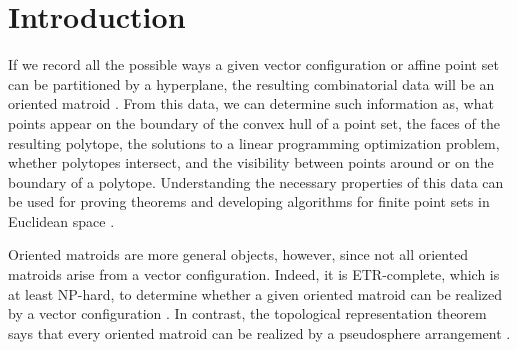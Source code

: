 \documentclass[11pt]{article}
\numberwithin{equation}{section}
\theoremstyle{remark}
\begin{document}
\section{Introduction}

If we record all the possible ways a given vector configuration or affine point set can be partitioned by a hyperplane, the resulting combinatorial data will be an oriented matroid \cite{bjorner1999oriented}.
From this data, we can determine such information as, what points appear on the boundary of the convex hull of a point set, the faces of the resulting polytope, the solutions to a linear programming optimization problem, whether polytopes intersect, and the visibility between points around or on the boundary of a polytope.
Understanding the necessary properties of this data can be used for proving theorems and developing algorithms for finite point sets in Euclidean space \cite{oswin2013,cardinal2019subquadratic,DobHolHub2014Erdos,habert2012,knuth1992axioms,novick1,novick2,shnurnikov2016tk}.

Oriented matroids are more general objects, however, since not all oriented matroids arise from a vector configuration. Indeed, it is ETR-complete, which is at least NP-hard, to determine whether a given oriented matroid can be realized by a vector configuration \cite{shor1991stretchability}.
In contrast, the topological representation theorem says that every oriented matroid can be realized by a pseudosphere arrangement \cite{folkman1978oriented}.
\end{document}
